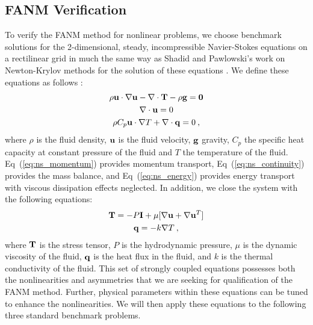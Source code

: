 \subsection{FANM Verification}
\label{subsec:fanm_verification}
To verify the FANM method for nonlinear problems, we choose benchmark
solutions for the 2-dimensional, steady, incompressible Navier-Stokes
equations on a rectilinear grid in much the same way as Shadid and
Pawlowski's work on Newton-Krylov methods for the solution of these
equations \citep{shadid_inexact_1997,pawlowski_globalization_2006}. We
define these equations as follows :
\begin{subequations}
  \begin{gather}
    \rho \mathbf{u} \cdot \nabla \mathbf{u} - \nabla \cdot \mathbf{T} - \rho
    \mathbf{g} = \mathbf{0}
    \label{eq:ns_momentum}\\
    \nabla \cdot \mathbf{u} = 0
    \label{eq:ns_continuity}\\
    \rho C_p \mathbf{u} \cdot \nabla T + \nabla \cdot \mathbf{q} = 0\:,
    \label{eq:ns_energy}
  \end{gather}
  \label{eq:navier_stokes}
\end{subequations}
where $\rho$ is the fluid density, $\mathbf{u}$ is the fluid velocity,
$\mathbf{g}$ gravity, $C_p$ the specific heat capacity at constant
pressure of the fluid and $T$ the temperature of the
fluid. Eq~(\ref{eq:ns_momentum}) provides momentum transport,
Eq~(\ref{eq:ns_continuity}) provides the mass balance, and
Eq~(\ref{eq:ns_energy}) provides energy transport with viscous
dissipation effects neglected. In addition, we close the system with
the following equations:
\begin{subequations}
  \begin{gather}
    \mathbf{T} = -P \mathbf{I} + \mu[\nabla \mathbf{u} + \nabla \mathbf{u}^T]
    \label{eq:ns_stress_tensor}\\
    \mathbf{q} = - k \nabla T\:,
    \label{eq:ns_heat_flux}
  \end{gather}
  \label{eq:ns_closure}
\end{subequations}
where $\mathbf{T}$ is the stress tensor, $P$ is the hydrodynamic pressure,
$\mu$ is the dynamic viscosity of the fluid, $\mathbf{q}$ is the heat flux
in the fluid, and $k$ is the thermal conductivity of the fluid. This
set of strongly coupled equations possesses both the nonlinearities
and asymmetries that we are seeking for qualification of the FANM
method. Further, physical parameters within these equations can be
tuned to enhance the nonlinearities. We will then apply these
equations to the following three standard benchmark problems.


